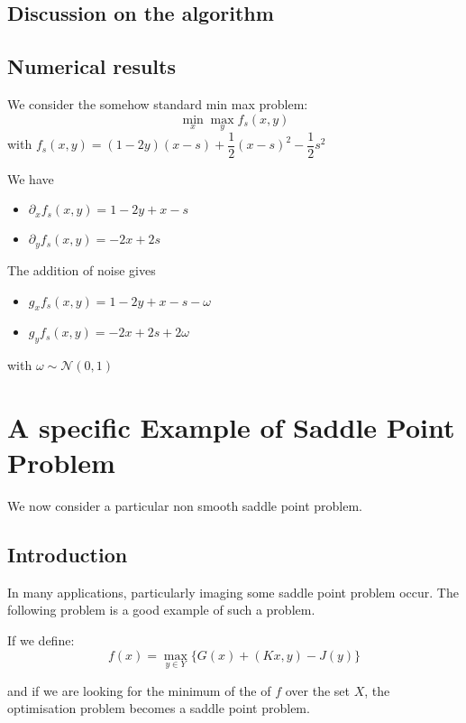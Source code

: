 \documentclass[10pt]{article}
\begin{document}
\subsection{Discussion on the algorithm}

\subsection{Numerical results}

We consider the somehow standard min max problem:
$$
\min_{x}\max_{y} f_{s}(x,y)
$$
with $f_{s}(x,y) = (1 - 2y)(x - s) + \dfrac{1}{2}(x - s)^{2} - \dfrac{1}{2}s^{2} $

We have 

\begin{itemize}
\item $\partial_{x} f_{s}(x,y) = 1 - 2y + x - s$
\item $\partial_{y} f_{s}(x,y) = -2x + 2s$
\end{itemize}

The addition of noise gives

\begin{itemize}
\item $g_{x} f_{s}(x,y) = 1 - 2y + x - s - \omega$
\item $g_{y} f_{s}(x,y) = -2x + 2s + 2\omega$
\end{itemize}

with $\omega \sim \mathcal{N}(0,1)$

\newpage

\section{ A specific Example of Saddle Point Problem}

We now consider a particular  non smooth saddle point problem.

\subsection{Introduction}

In many applications, particularly imaging some saddle point problem occur. The following problem is a good example of such a problem.

If we define:
$$
f(x) = \max_{y \in Y} \{ G(x) + (Kx,y) - J(y) \} 
$$

and if we are looking for the minimum of the of $f$ over the set $X$, the optimisation problem becomes a saddle point problem.
\end{document}
